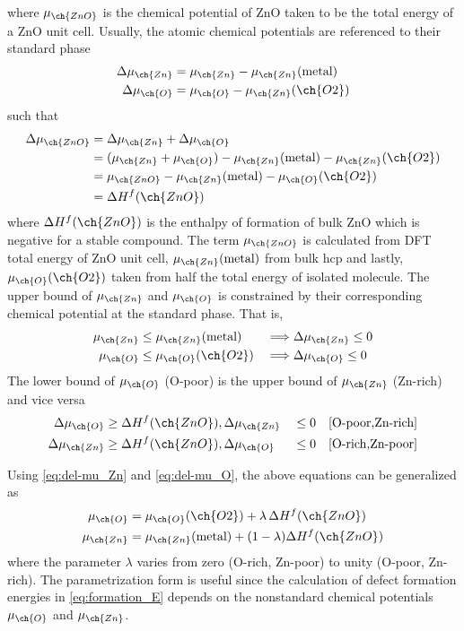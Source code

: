 where $\mu_{\ch{ZnO}}$ is the chemical potential of ZnO taken to be the total energy of a ZnO unit cell. Usually, the atomic chemical potentials are referenced to their standard phase
\begin{align}
	\Delta \mu_{\ch{Zn}} & = \mu_{\ch{Zn}} - \mu_{\ch{Zn}}(\text{metal}) \label{eq:del-mu_Zn} \\
	\Delta \mu_{\ch{O}}  & = \mu_{\ch{O}} - \mu_{\ch{Zn}}(\ch{O2}) \label{eq:del-mu_O}
\end{align}
such that
\begin{align}
	\Delta \mu_{\ch{ZnO}} & = \Delta \mu_{\ch{Zn}} +   \Delta \mu_{\ch{O}}                                          \\
	                      & = (\mu_{\ch{Zn}} + \mu_{\ch{O}}) - \mu_{\ch{Zn}}(\text{metal}) - \mu_{\ch{Zn}}(\ch{O2}) \\
	                      & = \mu_{\ch{ZnO}} - \mu_{\ch{Zn}}(\text{metal}) - \mu_{\ch{O}}(\ch{O2})                  \\
	                      & = \Delta H^f (\ch{ZnO})
\end{align}
where $\Delta H^f (\ch{ZnO})$ is the enthalpy of formation of bulk ZnO which is negative for a stable compound. The term $\mu_{\ch{ZnO}}$ is calculated from DFT total energy of ZnO unit cell, $\mu_{\ch{Zn}}(\text{metal})$ from bulk hcp  and lastly, $\mu_{\ch{O}}(\ch{O2})$ taken from half the total energy of isolated  molecule. The upper bound of $\mu_{\ch{Zn}}$ and  $\mu_{\ch{O}}$ is constrained by their corresponding chemical potential at the standard phase. That is,
\begin{alignat}{2}
	\mu_{\ch{Zn}} & \leq \mu_{\ch{Zn}}(\text{metal}) &  & \Longrightarrow \Delta \mu_{\ch{Zn}} \leq 0 \\
	\mu_{\ch{O}}  & \leq \mu_{\ch{O}}(\ch{O2})       &  & \Longrightarrow \Delta \mu_{\ch{O}} \leq 0
\end{alignat}
The lower bound of $\mu_{\ch{O}}$ (O-poor) is the upper bound of $\mu_{\ch{Zn}}$ (Zn-rich) and vice versa
\begin{alignat}{2}
	\Delta \mu_{\ch{O}}  & \geq \Delta H^f (\ch{ZnO}), \Delta \mu_{\ch{Zn}} &  & \leq 0 \quad [\text{O-poor,Zn-rich}] \\
	\Delta \mu_{\ch{Zn}} & \geq \Delta H^f (\ch{ZnO}), \Delta \mu_{\ch{O}}  &  & \leq 0 \quad [\text{O-rich,Zn-poor}]
\end{alignat}

Using \eqref{eq:del-mu_Zn} and \eqref{eq:del-mu_O}, the above equations can be generalized as \citep{Sun2012}
\begin{align}
	\mu_{\ch{O}}  & = \mu_{\ch{O}}(\ch{O2}) + \lambda\, \Delta H^f (\ch{ZnO})           \\
	\mu_{\ch{Zn}} & = \mu_{\ch{Zn}}(\text{metal}) + (1 - \lambda) \Delta H^f (\ch{ZnO})
\end{align}
where the parameter $\lambda$ varies from zero (O-rich, Zn-poor) to unity (O-poor, Zn-rich). The parametrization form is useful since the calculation of defect formation energies in \eqref{eq:formation_E} depends on the nonstandard chemical potentials $\mu_{\ch{O}}$ and $\mu_{\ch{Zn}}$.

